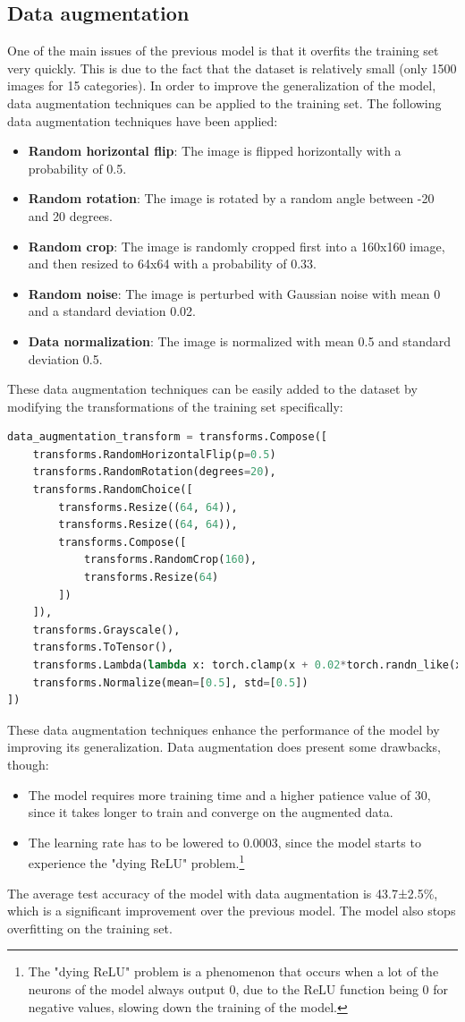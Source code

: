 \documentclass[a4paper, 11pt]{article}
\begin{document}
\subsection{Data augmentation}
One of the main issues of the previous model is that it overfits the training set very quickly.
This is due to the fact that the dataset is relatively small (only 1500 images for 15 categories).
In order to improve the generalization of the model, data augmentation techniques can be applied to the training set.
The following data augmentation techniques have been applied:
\begin{itemize}
    \item \textbf{Random horizontal flip}: The image is flipped horizontally with a probability of 0.5.
    \item \textbf{Random rotation}: The image is rotated by a random angle between -20 and 20 degrees.
    \item \textbf{Random crop}: The image is randomly cropped first into a 160x160 image, and then resized to 64x64 with a probability of 0.33.
    \item \textbf{Random noise}: The image is perturbed with Gaussian noise with mean 0 and a standard deviation 0.02.
    \item \textbf{Data normalization}: The image is normalized with mean 0.5 and standard deviation 0.5.
\end{itemize}
These data augmentation techniques can be easily added to the dataset by modifying the transformations of the training set specifically:
\begin{lstlisting}[language=Python]
data_augmentation_transform = transforms.Compose([
    transforms.RandomHorizontalFlip(p=0.5)
    transforms.RandomRotation(degrees=20),
    transforms.RandomChoice([
        transforms.Resize((64, 64)),
        transforms.Resize((64, 64)),
        transforms.Compose([
            transforms.RandomCrop(160),
            transforms.Resize(64)
        ])
    ]),
    transforms.Grayscale(),
    transforms.ToTensor(),
    transforms.Lambda(lambda x: torch.clamp(x + 0.02*torch.randn_like(x),min=0.,max=1.)),
    transforms.Normalize(mean=[0.5], std=[0.5])
])
\end{lstlisting}

These data augmentation techniques enhance the performance of the model by improving its generalization.
Data augmentation does present some drawbacks, though:
\begin{itemize}
    \item The model requires more training time and a higher patience value of 30, since it takes longer to train and converge on the augmented data.
    \item The learning rate has to be lowered to 0.0003, since the model starts to experience the "dying ReLU" problem.\footnote{The "dying ReLU" problem is a phenomenon that occurs when a lot of the neurons of the model always output 0, due to the ReLU function being 0 for negative values, slowing down the training of the model.}
\end{itemize}
The average test accuracy of the model with data augmentation is 43.7±2.5\%, which is a significant improvement over the previous model.
The model also stops overfitting on the training set.
\pagebreak
\end{document}
